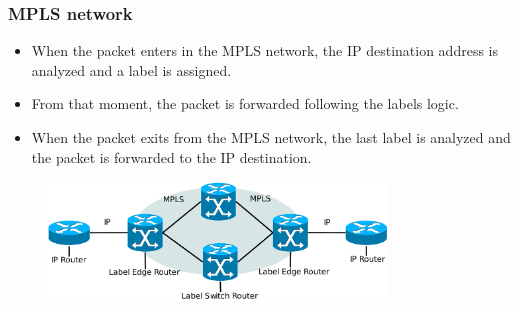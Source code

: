\documentclass{beamer}
\begin{document}
{
  \frametitle{MPLS network}

  \begin{itemize}
  \item<1-> When the packet enters in the MPLS network, the IP
    destination address is analyzed and a label is assigned.
  \item<2-> From that moment, the packet is forwarded following the
    labels logic.
  \item<3-> When the packet exits from the MPLS network, the last
    label is analyzed and the packet is forwarded to the IP
    destination.
  \end{itemize}
  
  \begin{figure}[!hbp]
    \centering
    \includegraphics[width=0.8\textwidth]{img/mpls_net}
  \end{figure}
}
\end{document}
